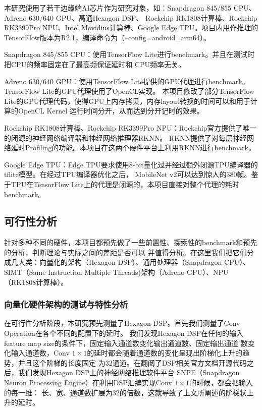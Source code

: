 本研究使用了若干边缘端AI芯片作为研究对象，如：Snapdragon 845/855 CPU、Adreno 630/640 GPU、高通Hexagon DSP、
Rockchip RK1808计算棒、Rockchip RK3399Pro NPU、Intel Movidius计算棒、Google Edge TPU。项目内用作推理的
TensorFlow版本为R2.1，编译命令为（--config=android_arm64）。

Snapdragon 845/855 CPU：使用TensorFlow Lite进行benchmark。并且在测试时把CPU的频率固定在了最高频保证延时和
CPU频率无关。

Adreno 630/640 GPU：使用TensorFlow Lite提供的GPU代理进行benchmark。TensorFlow Lite的GPU代理使用了OpenCL实现。
本项目修改了部分TensorFlow Lite的GPU代理代码，使得GPU上内存拷贝，内存layout转换的时间可以和用于计算的OpenCL Kernel
运行时间分开，从而达到分开记时的效果。

Rockchip RK1808计算棒、Rockchip RK3399Pro NPU：Rockchip官方提供了唯一的闭源的神经网络编译器和神经网络推理器RKNN。
RKNN提供了对每层神经网络延时Profiling的功能。本项目在这两个硬件平台上利用RKNN进行benchmark。

Google Edge TPU：Edge TPU要求使用8-bit量化过并经过额外闭源TPU编译器的tflite模型。在经过TPU编译器优化之后，
MobileNet v2可以达到惊人的380帧。鉴于TPU在TensorFlow Lite上的代理是闭源的，本项目直接对整个代理的耗时benchmark。

\subsection{可行性分析}

针对多种不同的硬件，本项目都预先做了一些前置性、探索性的benchmark和预先的分析，判断理论与实际之间的差距是否可以
并值得分析。在这里我们把它们分成几大类：向量化的架构（Hexagon DSP）、通用处理器（Snapdragon CPU）、
SIMT（Same Instruction Multiple Threads)架构（Adreno GPU）、NPU（RK1808计算棒）。

\subsubsection{向量化硬件架构的测试与特性分析}

在可行性分析阶段，本研究预先测量了Hexagon DSP。首先我们测量了Conv Operation在各个不同的配置下的延时。
我们发现Hexagon DSP在任何的输入feature map size的条件下，固定输入通道数变化输出通道数、固定输出通道
数变化输入通道数，Conv $1\times 1$的延时都会随着通道数的变化呈现出阶梯化上升的趋势，并且这个阶梯的长度固定
为32通道。在翻阅了DSP相关官方文档开源代码之后，我们发现Hexagon DSP上的神经网络推理软件平台
SNPE（Snapdragon Neuron Processing Engine）在利用DSP汇编实现Conv $1\times 1$的时候，都会把输入的每一维：
长、宽、通道数扩展为32的倍数，这就导致了上文所阐述的阶梯状上升的延时。

